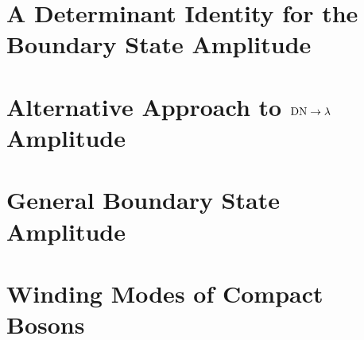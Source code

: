 \documentclass[reprint, prb]{revtex4-1}
\begin{document}
\section{A Determinant Identity for the Boundary State Amplitude}
\label{app:pf_of_id}


\section{Alternative Approach to ${\rm DN} \rightarrow \lambda$ Amplitude}
\label{app:gnd_dn_lambda}


\section{General Boundary State Amplitude}
\label{app:lambda_12}


\section{Winding Modes of Compact Bosons}
\label{app:compact_diff_boson}




\end{document}
